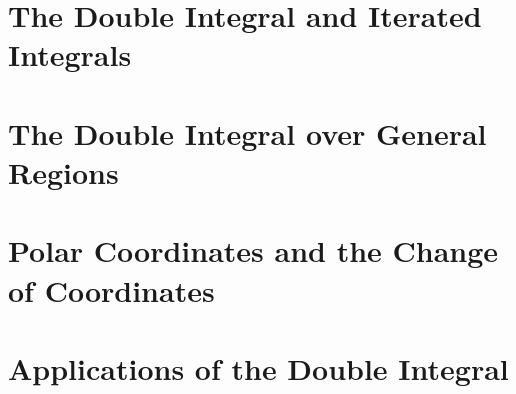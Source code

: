 \documentclass[a4paper, 11pt]{article}
\begin{document}
\maketitle
\thispagestyle{firstpage}

\tableofcontents
\newpage

\setcounter{section}{9}
\setcounter{question}{90}

\section{The Double Integral and Iterated Integrals}


\section{The Double Integral over General Regions}


\section{Polar Coordinates and the Change of Coordinates}


\section{Applications of the Double Integral}

\end{document}
